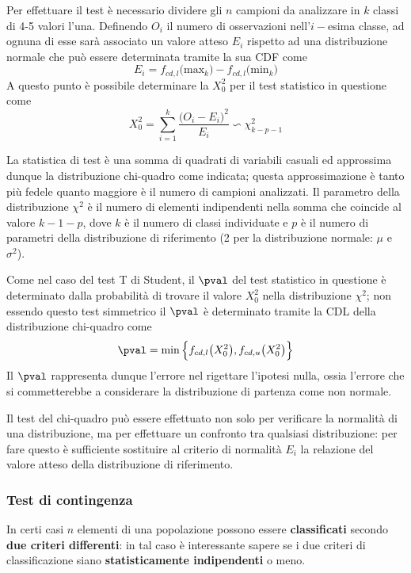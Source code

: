 		Per effettuare il test è necessario dividere gli $n$ campioni da analizzare in $k$ classi di 4-5 valori l'una. Definendo $O_i$ il numero di osservazioni nell'$i-$esima classe, ad ognuna di esse sarà associato un valore atteso $E_i$ rispetto ad una distribuzione normale che può essere determinata tramite la sua CDF come
		\[ E_i = f_{cd,l}\big(\textrm{max}_k \big) - f_{cd,l}\big(\textrm{min}_k\big)\]
		A questo punto è possibile determinare la  $X_0^2$ per il test statistico in questione come
		\[ X_0^2 = \sum_{i=1}^k \frac{\big(O_i - E_i\big)^2}{E_i} \backsim 	\chi^2_{k-p-1}  \]
		
		La statistica di test è una somma di quadrati di variabili casuali ed approssima dunque la distribuzione chi-quadro come indicata; questa approssimazione è tanto più fedele quanto maggiore è il numero di campioni analizzati. Il parametro della distribuzione $\chi^2$ è il numero di elementi indipendenti nella somma che coincide al valore $k-1-p$, dove $k$ è il numero di classi individuate e $p$ è il numero di parametri della distribuzione di riferimento (2 per la distribuzione normale: $\mu$ e $\sigma^2$).
		
		Come nel caso del test T di Student, il $\pval$ del test statistico in questione è determinato dalla probabilità di trovare il valore $X_0^2$ nella distribuzione $\chi^2$; non essendo questo test simmetrico il $\pval$ è determinato tramite la CDL della distribuzione chi-quadro come
		\[\pval = \min \Big\{f_{cd,l}\big(X_0^2\big), f_{cd,u}\big(X_0^2\big)\Big\}\]
		Il $\pval$ rappresenta dunque l'errore nel rigettare l'ipotesi nulla, ossia l'errore che si commetterebbe a considerare la distribuzione di partenza come non normale.
		
		\begin{nota}
			Il test del chi-quadro può essere effettuato non solo per verificare la normalità di una distribuzione, ma per effettuare un confronto tra qualsiasi distribuzione: per fare questo è sufficiente sostituire al criterio di normalità $E_i$ la relazione del valore atteso della distribuzione di riferimento.
		\end{nota}
		
		\subsubsection{Test di contingenza}
		In certi casi $n$ elementi di una popolazione possono essere \textbf{classificati} secondo \textbf{due criteri differenti}: in tal caso è interessante sapere se i due criteri di classificazione siano \textbf{statisticamente indipendenti} o meno.
		
